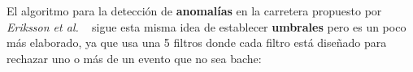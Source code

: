 


		El algoritmo para la detección de \textbf{anomalías} en la carretera propuesto por \emph{Eriksson et al.} ~ sigue
		esta misma idea de establecer \textbf{umbrales} pero es un poco más elaborado, ya que usa una 5 filtros donde cada filtro está diseñado
		para rechazar uno o más de un evento que no sea bache:\\

